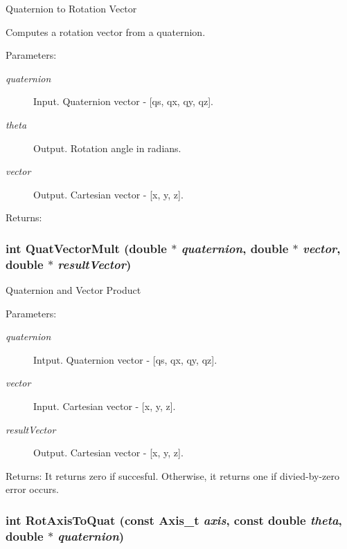 Quaternion to Rotation Vector 

Computes a rotation vector from a quaternion.

\begin{Desc}
\item[Parameters:]
\begin{description}
\item[{\em quaternion}]Input. Quaternion vector - \mbox{[}qs, qx, qy, qz\mbox{]}. \item[{\em theta}]Output. Rotation angle in radians. \item[{\em vector}]Output. Cartesian vector - \mbox{[}x, y, z\mbox{]}.\end{description}
\end{Desc}
\begin{Desc}
\item[Returns:]\end{Desc}
\hypertarget{group__quaternion_g67f342a45d5ce0d7a1c354d39e443f08}{
\subsubsection[QuatVectorMult]{\setlength{\rightskip}{0pt plus 5cm}int QuatVectorMult (double $\ast$ {\em quaternion}, \/  double $\ast$ {\em vector}, \/  double $\ast$ {\em resultVector})}}
\label{group__quaternion_g67f342a45d5ce0d7a1c354d39e443f08}


Quaternion and Vector Product 

\begin{Desc}
\item[Parameters:]
\begin{description}
\item[{\em quaternion}]Intput. Quaternion vector - \mbox{[}qs, qx, qy, qz\mbox{]}. \item[{\em vector}]Input. Cartesian vector - \mbox{[}x, y, z\mbox{]}. \item[{\em resultVector}]Output. Cartesian vector - \mbox{[}x, y, z\mbox{]}.\end{description}
\end{Desc}
\begin{Desc}
\item[Returns:]It returns zero if succesful. Otherwise, it returns one if divied-by-zero error occurs. \end{Desc}
\hypertarget{group__quaternion_gc0787b2da064df053ecf6ff927646b33}{
\subsubsection[RotAxisToQuat]{\setlength{\rightskip}{0pt plus 5cm}int RotAxisToQuat (const {\bf Axis\_\-t} {\em axis}, \/  const double {\em theta}, \/  double $\ast$ {\em quaternion})}}
\label{group__quaternion_gc0787b2da064df053ecf6ff927646b33}


